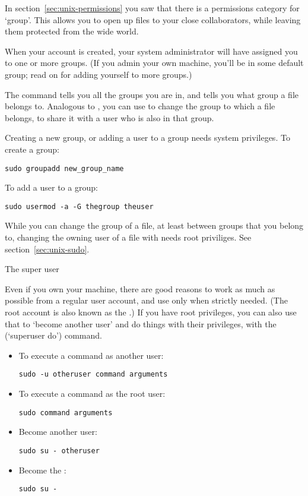 In section~\ref{sec:unix-permissions} you saw that there is a
permissions category for `group'. This allows you to open up files to
your close collaborators, while leaving them protected from the wide
world.

When your account is created, your system administrator will have
assigned you to one or more groups. (If you admin your own machine,
you'll be in some default group; read on for adding yourself to more groups.)

The command 
tells you all the groups you are in, and  tells you
what group a file belongs to. Analogous to ,
you can use  to change the group to
which a file belongs, to share it with a user who is also in that group.

Creating a new group, or
adding a user to a group needs system privileges.
To create a group:
\begin{lstlisting}
sudo groupadd new_group_name
\end{lstlisting}
To add a user to a group:
\begin{lstlisting}
sudo usermod -a -G thegroup theuser
\end{lstlisting}

While you can change the group of a file,
at least between groups that you belong to,
changing the owning user of a file with 
needs root priviliges. See section~\ref{sec:unix-sudo}.

 {The super user}
\label{sec:unix-sudo}

Even if you own your machine, there are good reasons to work as much
as possible from a regular user account, and use
 only when strictly needed.
%
(The root account is also known as the .)
%
If you have root privileges, you can also use that to `become another
user' and do things with their privileges, with the
 (`superuser do') command.

\begin{itemize}
\item To execute a command as another user:
\begin{lstlisting}
sudo -u otheruser command arguments
\end{lstlisting}
\item To execute a command as the root user:
\begin{lstlisting}
sudo command arguments
\end{lstlisting}
\item Become another user:
\begin{lstlisting}
sudo su - otheruser
\end{lstlisting}
\item Become the :
\begin{lstlisting}
sudo su -
\end{lstlisting}
\end{itemize}

